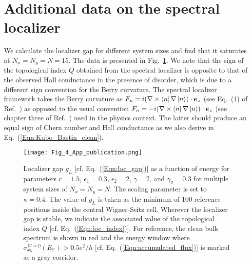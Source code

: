\documentclass[aps,prb,amsmath,amssymb,twocolumn, superscriptaddress]{revtex4-2}
\newcommand{\eq}[1]{Eq.~(\ref{#1})}
\begin{document}
\section{Additional data on the spectral localizer}
We calculate the localizer gap for different system sizes and find that it saturates at $N_x  = N_y = N = 15$. The data is presented in Fig.~\ref{Fig:Spec_Loc_Data_size}. We note that the sign of the topological index $Q$ obtained from the spectral localizer is opposite to that of the observed Hall conductance in the presence of disorder, which is due to a different sign convention for the Berry curvature. The spectral localizer framework takes the Berry curvature as $F_n = i (\nabla \times \bra{n} \nabla \ket{n}) \cdot \bm e_z$ (see Eq.~(1) of Ref.~\cite{Spec_loc_5_App}) as opposed to the usual convention $F_n = -i (\nabla \times \bra{n} \nabla \ket{n} ) \cdot \bm e_z$ (see chapter three of Ref.~\cite{Bernevig_App}) used in the physics context. The latter should produce an equal sign of Chern number and Hall conductance as we also derive in \eq{Eqn:Kubo_Bastin_clean}. 

\begin{figure}[htp]	 
\texttt{[image: Fig\_4\_App\_publication.png]}
\caption{Localizer gap $g_L$ [cf. \eq{Eqn:loc_gap}] as a function of energy for parameters $r = 1.5$, $\epsilon_1 = 0.3$, $\epsilon_2 = 2$, $\gamma  =2$, and $\gamma_2 = 0.3$ for multiple 
system sizes of $N_x = N_y = N$. The scaling parameter is set to $\kappa = 0.4$. The value of $g_L$ is taken as the minimum of 100 reference positions inside the central Wigner-Seitz cell. Wherever the localizer gap is stable, we indicate the associated value of the topological index $Q$ [cf. \eq{Eqn:loc_index}]. For reference, the clean bulk spectrum is shown in red and the energy window where $\sigma_{xy}^{W=0}(E_\mathrm{F})  > 0.5 e^2 / h$ [cf. \eq{Eqn:accumulated_flux}] is marked as a gray corridor. }\label{Fig:Spec_Loc_Data_size}
\end{figure}
\end{document}
